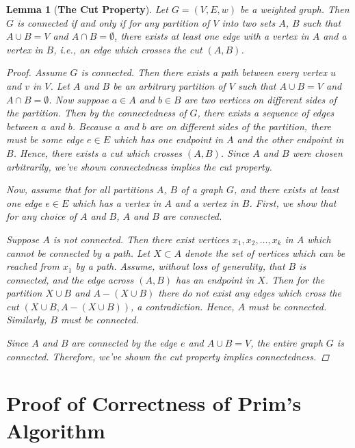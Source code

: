 \documentclass[a4paper,11pt]{report}
\theoremstyle{plain}
\newtheorem{lem}[thm]{Lemma}
\theoremstyle{definition}
\begin{document}
\begin{lem}[{\bfseries The Cut Property}]
Let $G = (V, E, w)$ be a weighted graph. Then $G$ is connected
if and only if for any partition of $V$ into two sets $A$, $B$ such that
$A \cup B = V$ and $A \cap B = \emptyset$, there exists at least
one edge with a vertex in $A$ and a vertex in $B$, i.e., an edge which
crosses the cut $(A, B)$.

\begin{proof}
Assume $G$ is connected. Then there exists a path between every vertex $u$ and
$v$ in $V$. Let $A$ and $B$ be an arbitrary partition of $V$ such that
$A \cup B = V$ and $A \cap B = \emptyset$. Now suppose $a \in A$ and $b \in B$
are two vertices on different sides of the partition. Then by the connectedness
of $G$, there exists a sequence of edges between $a$ and $b$. Because $a$ and
$b$ are on different sides of the partition, there must be some edge $e \in E$
which has one endpoint in $A$ and the other endpoint in $B$. Hence, there
exists a cut which crosses $(A, B)$. Since $A$ and $B$ were chosen arbitrarily,
we've shown connectedness implies the cut property.

Now, assume that for all partitions $A$, $B$ of a graph $G$, and there
exists at least one edge $e \in E$ which has a vertex in $A$ and a vertex in
$B$. First, we show that for any choice of $A$ and $B$, $A$ and $B$ are
connected.

Suppose $A$ is not connected. Then there exist vertices $x_1, x_2, \ldots, x_k$
in $A$ which cannot be connected by a path. Let $X \subset A$ denote the
set of vertices which can be reached from $x_1$ by a path. Assume, without loss
of generality, that $B$ is connected, and the edge across $(A, B)$ has an
endpoint in $X$. Then for the partition $X \cup B$ and $A - (X \cup B)$ there
do not exist any edges which cross the cut $(X \cup B, A - (X \cup B))$, a
contradiction. Hence, $A$ must be connected. Similarly, $B$ must be connected.

Since $A$ and $B$ are connected by the edge $e$ and $A \cup B = V$, the entire
graph $G$ is connected. Therefore, we've shown the cut property implies
connectedness.
\end{proof}
\end{lem}

\section{Proof of Correctness of Prim's Algorithm}
\end{document}
